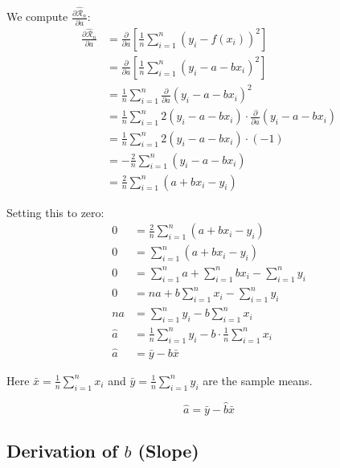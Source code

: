 \documentclass[main.tex]{subfiles}
\begin{document}
We compute $\frac{\partial \hat{\mathcal{R}}_n}{\partial a}$:
\begin{align}
\frac{\partial \hat{\mathcal{R}}_n}{\partial a} &= \frac{\partial}{\partial a} \left[ \frac{1}{n} \sum_{i=1}^{n} (y_i - f(x_i))^2 \right] \\[8pt]
&= \frac{\partial}{\partial a} \left[ \frac{1}{n} \sum_{i=1}^{n} (y_i - a - bx_i)^2 \right] \\[8pt]
&= \frac{1}{n} \sum_{i=1}^{n} \frac{\partial}{\partial a} (y_i - a - bx_i)^2 \\[8pt]
&= \frac{1}{n} \sum_{i=1}^{n} 2(y_i - a - bx_i) \cdot \frac{\partial}{\partial a}(y_i - a - bx_i) \\[8pt]
&= \frac{1}{n} \sum_{i=1}^{n} 2(y_i - a - bx_i) \cdot (-1) \\[8pt]
&= -\frac{2}{n} \sum_{i=1}^{n} (y_i - a - bx_i) \\[8pt]
&= \frac{2}{n} \sum_{i=1}^{n} (a + bx_i - y_i)
\end{align}

Setting this to zero:
\begin{align}
0 &= \frac{2}{n} \sum_{i=1}^{n} (a + bx_i - y_i) \\[8pt]
0 &= \sum_{i=1}^{n} (a + bx_i - y_i) \\[8pt]
0 &= \sum_{i=1}^{n} a + \sum_{i=1}^{n} bx_i - \sum_{i=1}^{n} y_i \\[8pt]
0 &= na + b\sum_{i=1}^{n} x_i - \sum_{i=1}^{n} y_i \\[8pt]
na &= \sum_{i=1}^{n} y_i - b\sum_{i=1}^{n} x_i \\[8pt]
\hat{a} &= \frac{1}{n}\sum_{i=1}^{n} y_i - b \cdot \frac{1}{n}\sum_{i=1}^{n} x_i \\[8pt]
\hat{a} &= \bar{y} - b\bar{x}
\end{align}

Here $\bar{x} = \frac{1}{n}\sum_{i=1}^{n} x_i$ and $\bar{y} = \frac{1}{n}\sum_{i=1}^{n} y_i$ are the sample means.

\begin{samepage}
$$\boxed{\hat{a} = \bar{y} - \hat{b}\bar{x}}$$
\end{samepage}

\subsection{Derivation of $\hat{b}$ (Slope)}
\end{document}
